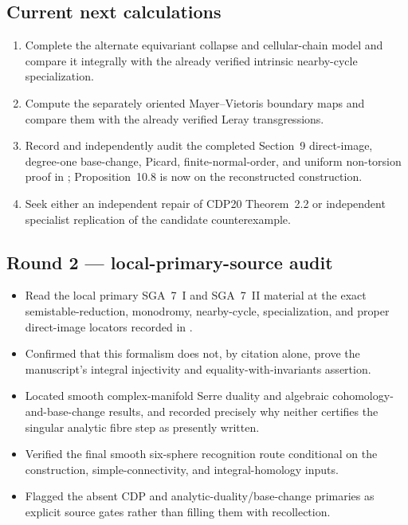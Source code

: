 \subsection*{Current next calculations}

\begin{enumerate}[leftmargin=1.8em]
\item Complete the alternate equivariant collapse and cellular-chain model
and compare it integrally with the already verified intrinsic nearby-cycle
specialization.
\item Compute the separately oriented Mayer--Vietoris boundary maps and
compare them with the already verified Leray transgressions.
\item Record and independently audit the completed Section~9 direct-image,
  degree-one base-change, Picard, finite-normal-order, and uniform
  non-torsion proof in ; Proposition~10.8 is now
  \Verified{} on the reconstructed construction.
\item Seek either an independent repair of CDP20 Theorem~2.2 or independent
specialist replication of the candidate counterexample.
\end{enumerate}

\subsection*{Round 2 --- local-primary-source audit}

\begin{itemize}[leftmargin=1.8em]
\item Read the local primary SGA~7~I and SGA~7~II material at the exact
semistable-reduction, monodromy, nearby-cycle, specialization, and proper
direct-image locators recorded in .
\item Confirmed that this formalism does not, by citation alone, prove the
manuscript's integral injectivity and equality-with-invariants assertion.
\item Located smooth complex-manifold Serre duality and algebraic
cohomology-and-base-change results, and recorded precisely why neither
certifies the singular analytic fibre step as presently written.
\item Verified the final smooth six-sphere recognition route conditional on
the construction, simple-connectivity, and integral-homology inputs.
\item Flagged the absent CDP and analytic-duality/base-change primaries as
explicit source gates rather than filling them with recollection.
\end{itemize}

